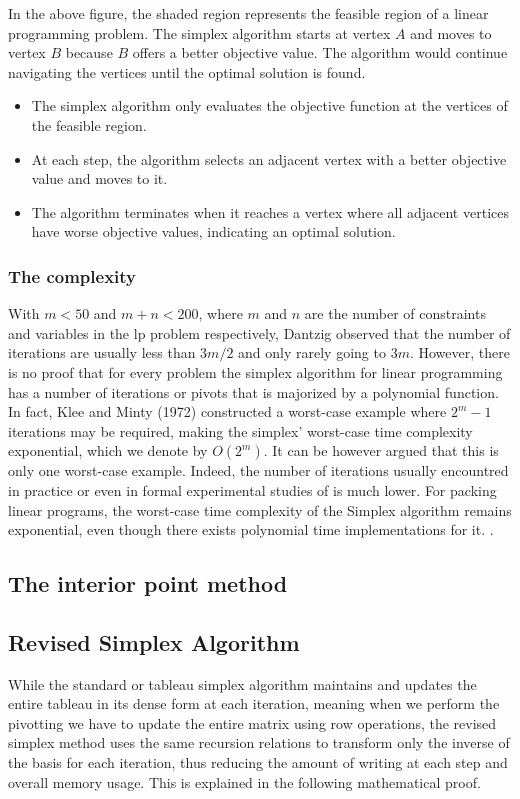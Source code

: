 In the above figure, the shaded region represents
the feasible region of a linear programming problem.
The simplex algorithm starts at vertex \(A\) and moves to
vertex \(B\) because \(B\) offers a better objective value.
The algorithm would continue navigating the vertices until
the optimal solution is found.
\begin{itemize}
    \item The simplex algorithm only evaluates the objective
          function at the vertices of the feasible region.
    \item At each step, the algorithm selects an adjacent
          vertex with a better objective value and moves to it.
    \item The algorithm terminates when it reaches a vertex where
          all adjacent vertices have worse objective values, indicating an
          optimal solution.
\end{itemize}
\subsubsection{The complexity}
With $m<50$ and $m+n<200$, where $m$ and $n$ are the number of constraints and variables in the \gls{lp}
problem respectively, Dantzig observed that the number of iterations are usually less than $3m/2$
and only rarely going to $3m$. However, there is no proof that for every
problem the simplex algorithm for
 linear programming has a number of iterations or pivots that 
is majorized by a polynomial function.
In fact, Klee and Minty (1972) \parencite{klee1972good} constructed a worst-case example where
 $2^m -1$ iterations may be required, making the simplex'
worst-case time complexity exponential, which we denote by \( O(2^m) \).
It can be however argued that this is only one worst-case example. Indeed, the number 
of iterations usually encountred in practice or even in formal experimental studies of is much lower.
For packing linear programs, the worst-case time complexity of the Simplex algorithm
remains exponential, even though there exists polynomial time implementations for it.
\parencite{stille2010solution}.

\subsection{The interior point method}

\subsection{Revised Simplex Algorithm}
While the standard or tableau simplex algorithm maintains and updates the entire tableau in its 
dense form at each iteration, meaning when we perform the pivotting we have to update the entire matrix
using row operations, the revised simplex 
method uses the same recursion relations to transform only the inverse of the basis for each iteration, thus 
reducing the amount of writing at each step and overall memory usage.
This is explained in the following mathematical proof.
